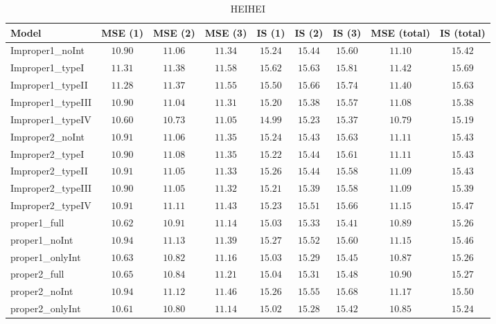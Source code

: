\begin{table}

\caption{\label{tab:model-choice-sc8}HEIHEI}
\centering
\begin{tabular}{lcccccccc}
\hline
Model  & MSE (1) & MSE (2) & MSE (3) & IS (1) & IS (2) & IS (3) & MSE (total) & \multicolumn{1}{c}{IS (total)} \\ 
\hline
Improper1_noInt  & $10.90$ & $11.06$ & $11.34$ & $15.24$ & $15.44$ & $15.60$ & $11.10$ & $15.42$ \\
Improper1_typeI  & $11.31$ & $11.38$ & $11.58$ & $15.62$ & $15.63$ & $15.81$ & $11.42$ & $15.69$ \\
Improper1_typeII  & $11.28$ & $11.37$ & $11.55$ & $15.50$ & $15.66$ & $15.74$ & $11.40$ & $15.63$ \\
Improper1_typeIII  & $10.90$ & $11.04$ & $11.31$ & $15.20$ & $15.38$ & $15.57$ & $11.08$ & $15.38$ \\
Improper1_typeIV  & $10.60$ & $10.73$ & $11.05$ & $14.99$ & $15.23$ & $15.37$ & $10.79$ & $15.19$ \\
Improper2_noInt  & $10.91$ & $11.06$ & $11.35$ & $15.24$ & $15.43$ & $15.63$ & $11.11$ & $15.43$ \\
Improper2_typeI  & $10.90$ & $11.08$ & $11.35$ & $15.22$ & $15.44$ & $15.61$ & $11.11$ & $15.43$ \\
Improper2_typeII  & $10.91$ & $11.05$ & $11.33$ & $15.26$ & $15.44$ & $15.58$ & $11.09$ & $15.43$ \\
Improper2_typeIII  & $10.90$ & $11.05$ & $11.32$ & $15.21$ & $15.39$ & $15.58$ & $11.09$ & $15.39$ \\
Improper2_typeIV  & $10.91$ & $11.11$ & $11.43$ & $15.23$ & $15.51$ & $15.66$ & $11.15$ & $15.47$ \\
proper1_full  & $10.62$ & $10.91$ & $11.14$ & $15.03$ & $15.33$ & $15.41$ & $10.89$ & $15.26$ \\
proper1_noInt  & $10.94$ & $11.13$ & $11.39$ & $15.27$ & $15.52$ & $15.60$ & $11.15$ & $15.46$ \\
proper1_onlyInt  & $10.63$ & $10.82$ & $11.16$ & $15.03$ & $15.29$ & $15.45$ & $10.87$ & $15.26$ \\
proper2_full  & $10.65$ & $10.84$ & $11.21$ & $15.04$ & $15.31$ & $15.48$ & $10.90$ & $15.27$ \\
proper2_noInt  & $10.94$ & $11.12$ & $11.46$ & $15.26$ & $15.55$ & $15.68$ & $11.17$ & $15.50$ \\
proper2_onlyInt  & $10.61$ & $10.80$ & $11.14$ & $15.02$ & $15.28$ & $15.42$ & $10.85$ & $15.24$ \\
\hline 
\end{tabular}


\end{table}